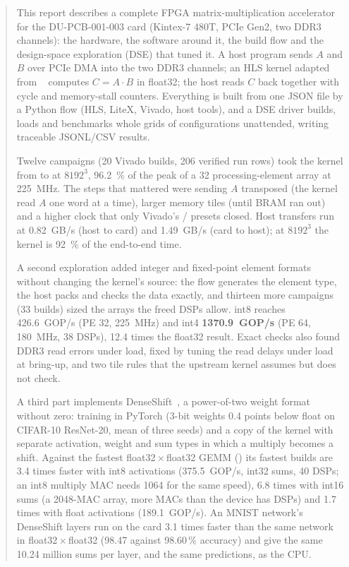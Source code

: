 \begin{abstract}
\noindent
This report describes a complete FPGA matrix-multiplication accelerator for the DU-PCB-001-003 card
(Kintex-7 480T, PCIe Gen2, two DDR3 channels): the hardware, the software around it, the build flow and the
design-space exploration (DSE) that tuned it. A host program sends \(A\) and \(B\) over PCIe DMA into the two DDR3
channels; an HLS kernel adapted from ~\cite{gemmhls} computes \(C = A\cdot B\) in float32; the host
reads \(C\) back together with cycle and memory-stall counters. Everything is built from one JSON file by a Python
flow (HLS, LiteX, Vivado, host tools), and a DSE driver builds, loads and benchmarks whole grids of configurations
unattended, writing traceable JSONL/CSV results.

Twelve campaigns (20 Vivado builds, 206 verified run rows) took the kernel from  to
\textbf{} at \(8192^3\), \SI{96.2}{\percent} of the  peak of a 32 processing-element
array at \SI{225}{MHz}. The steps that mattered were sending \(A\) transposed (the kernel read \(A\) one word at a
time), larger memory tiles (until BRAM ran out) and a higher clock that only Vivado's /
presets closed. Host transfers run at \SI{0.82}{GB/s} (host to card) and \SI{1.49}{GB/s} (card to host); at
\(8192^3\) the kernel is \SI{92}{\percent} of the end-to-end time.

A second exploration added integer and fixed-point element formats without changing the kernel's source: the flow
generates the element type, the host packs and checks the data exactly, and thirteen more campaigns (33 builds) sized
the arrays the freed DSPs allow. int8 reaches \SI{426.6}{GOP/s} (PE 32, \SI{225}{MHz}) and int4
\textbf{\SI{1370.9}{GOP/s}} (PE 64, \SI{180}{MHz}, 38 DSPs), 12.4 times the float32 result. Exact checks
also found DDR3 read errors under load, fixed by tuning the read delays under load at bring-up, and two tile rules
that the upstream kernel assumes but does not check.

A third part implements DenseShift~\cite{denseshift}, a power-of-two weight format without zero: training in PyTorch
(3-bit weights 0.4 points below float on CIFAR-10 ResNet-20, mean of three seeds) and a copy of the kernel with
separate activation, weight and sum types in which a multiply becomes a shift. Against the fastest
float32\,\(\times\)\,float32 GEMM () its fastest builds are 3.4 times faster with int8 activations
(\SI{375.5}{GOP/s}, int32 sums, 40 DSPs; an int8 multiply MAC needs 1064 for the same speed), 6.8 times with int16
sums (a 2048-MAC array, more MACs than the device has DSPs) and 1.7 times with float activations
(\SI{189.1}{GOP/s}). An MNIST network's DenseShift layers run on the card 3.1 times faster than the same
network in float32\,\(\times\)\,float32 (98.47 against 98.60\,\% accuracy) and give the same 10.24 million sums per
layer, and the same predictions, as the CPU.
\end{abstract}
